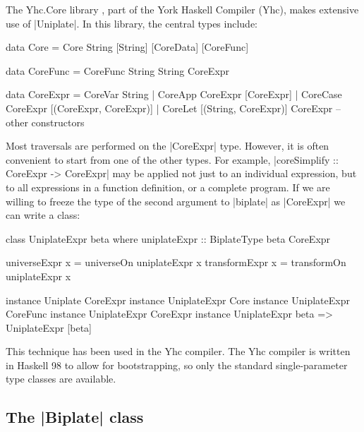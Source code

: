 \begin{example}
The Yhc.Core library \citep{me:yhc_core}, part of the York Haskell Compiler (Yhc), makes extensive use of |Uniplate|. In this library, the central types include:

\begin{comment}
\begin{code}
data CoreData = CoreData
\end{code}
\end{comment}

\begin{code}
data Core      =  Core String [String] [CoreData] [CoreFunc]

data CoreFunc  =  CoreFunc String String CoreExpr

data CoreExpr  =  CoreVar   String
               |  CoreApp   CoreExpr  [CoreExpr]
               |  CoreCase  CoreExpr  [(CoreExpr, CoreExpr)]
               |  CoreLet   [(String, CoreExpr)] CoreExpr
                  -- other constructors
\end{code}

Most traversals are performed on the |CoreExpr| type. However, it is often convenient to start from one of the other types. For example, |coreSimplify :: CoreExpr -> CoreExpr| may be applied not just to an individual expression, but to all expressions in a function definition, or a complete program. If we are willing to freeze the type of the second argument to |biplate| as |CoreExpr| we can write a class:

\begin{code}
class  UniplateExpr beta where
       uniplateExpr :: BiplateType beta CoreExpr

universeExpr   x = universeOn   uniplateExpr x
transformExpr  x = transformOn  uniplateExpr x

instance Uniplate CoreExpr
instance UniplateExpr Core
instance UniplateExpr CoreFunc
instance UniplateExpr CoreExpr
instance UniplateExpr beta => UniplateExpr [beta]
\end{code}\codeexample
\end{example}
\bigskip

This technique has been used in the Yhc compiler. The Yhc compiler is written in Haskell 98 to allow for bootstrapping, so only the standard single-parameter type classes are available.

\subsection{The |Biplate| class}

